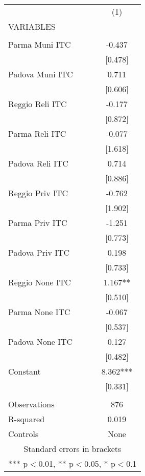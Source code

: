\begin{tabular}{lc} \hline
 & (1) \\
VARIABLES &  \\ \hline
 &  \\
Parma Muni ITC & -0.437 \\
 & [0.478] \\
Padova Muni ITC & 0.711 \\
 & [0.606] \\
Reggio Reli ITC & -0.177 \\
 & [0.872] \\
Parma Reli ITC & -0.077 \\
 & [1.618] \\
Padova Reli ITC & 0.714 \\
 & [0.886] \\
Reggio Priv ITC & -0.762 \\
 & [1.902] \\
Parma Priv ITC & -1.251 \\
 & [0.773] \\
Padova Priv ITC & 0.198 \\
 & [0.733] \\
Reggio None ITC & 1.167** \\
 & [0.510] \\
Parma None ITC & -0.067 \\
 & [0.537] \\
Padova None ITC & 0.127 \\
 & [0.482] \\
Constant & 8.362*** \\
 & [0.331] \\
 &  \\
Observations & 876 \\
R-squared & 0.019 \\
 Controls & None \\ \hline
\multicolumn{2}{c}{ Standard errors in brackets} \\
\multicolumn{2}{c}{ *** p$<$0.01, ** p$<$0.05, * p$<$0.1} \\
\end{tabular}

